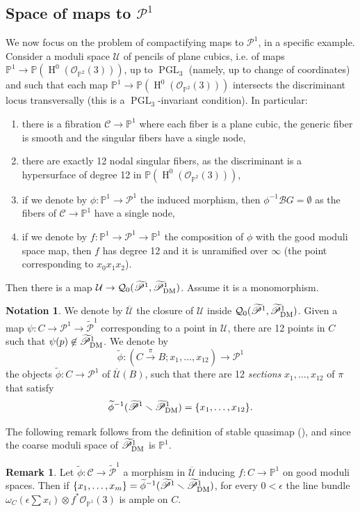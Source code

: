 \documentclass{amsart}
\newcommand{\bP}{\mathbb{P}}
\newcommand{\oH}{\operatorname{H}}
\newcommand{\sP}{\mathscr{P}}
\newcommand{\cB}{\mathcal{B}}
\newcommand{\cC}{\mathcal{C}}
\newcommand{\cO}{\mathcal{O}}
\newcommand{\cQ}{\mathcal{Q}}
\newcommand{\cU}{\mathcal{U}}
\newcommand{\PGL}{\operatorname{PGL}}
\newcommand{\dm}{{\rm DM}}
\theoremstyle{definition}
\newtheorem{Notation}[theorem]{Notation}
\newtheorem{Remark}[theorem]{Remark}
\theoremstyle{definition}
\begin{document}
{\subsection{Space of maps to $\sP^1$}
We now focus on the problem of compactifying maps to $\sP^1$, in a specific example. Consider a moduli space $\cU$ of pencils of plane cubics, i.e. of maps $\bP^1\to \bP(\oH^0(\cO_{\bP^2}(3)))$, up to $\PGL_3$ (namely, up to change of coordinates) and such that each map $\bP^1\to \bP(\oH^0(\cO_{\bP^2}(3)))$ intersects the discriminant locus transversally (this is a $\PGL_3$-invariant condition). In particular:
\begin{enumerate}
    \item there is a fibration $\cC\to \bP^1$ where each fiber is a plane cubic, the generic fiber is smooth and the singular fibers have a single node,
    \item there are exactly 12 nodal singular fibers, as the discriminant is a hypersurface of degree 12 in $\bP(\oH^0(\cO_{\bP^2}(3)))$,
    \item if we denote by $\phi:\bP^1\to \sP^1$ the induced morphism, then $\phi^{-1}\cB G=\emptyset$ as the fibers of $\cC\to\bP^1$ have a single node,
    \item if we denote by $f:\bP^1\to \sP^1\to\bP^1$ the composition of $\phi$ with the good moduli space map, then $f$ has degree 12 and it is unramified over $\infty$ (the point corresponding to $x_0x_1x_2$).
\end{enumerate}
Then there is a map $\cU\to \cQ_{0}(\widetilde{\sP}^1,\widetilde{\sP}^1_\dm)$. Assume it is a monomorphism. 
\begin{Notation}\label{notation_sections}
    We denote by $\overline{\cU}$ the closure of $\cU$ inside $\cQ_{0}(\widetilde{\sP}^1,\widetilde{\sP}^1_\dm)$. Given a map $\psi:C\to\sP^1\to \widetilde{\sP}^1$ corresponding to a point in $\cU$, there are 12 points in $C$ such that $\psi(p)\not \in \widetilde{\sP}^1_\dm$. We denote by \[\widetilde{\phi}:(C\xrightarrow{\pi} B;x_1,\ldots,x_{12})\to \sP^1\]
    the objects $\widetilde{\phi}:C\to\sP^1$ of $\overline{\cU}(B)$, such that there are 12 \textit{sections} $x_1,\ldots,x_{12}$ of $\pi$ that satisfy \[\widetilde{\phi}^{-1}(\widetilde{\sP}^1\smallsetminus\widetilde{\sP}^1_\dm) = \{x_1,\ldots,x_{12}\}.\] 
\end{Notation}
The following remark follows from the definition of stable quasimap (), and since the coarse moduli space of $\widetilde{\sP}^1_\dm$ is $\bP^1$.
\begin{Remark}
    Let $\widetilde{\phi}:\cC\to \widetilde{\sP}^1$ a morphism in $\overline{\cU}$ inducing $f:C\to \bP^1$ on good moduli spaces. Then if $\{x_1,\ldots,x_m\}=\widetilde{\phi}^{-1}(\widetilde{\sP}^1\smallsetminus\widetilde{\sP}^1_\dm)$, for every $0<\epsilon $ the line bundle $\omega_C(\epsilon\sum x_i)\otimes f^*\cO_{\bP^1}(3)$ is ample on $C$.
\end{Remark}

}
\end{document}
